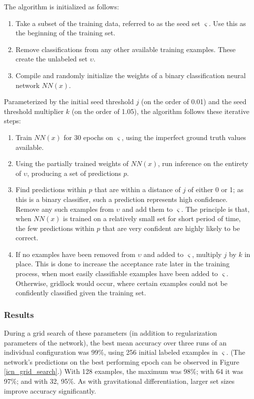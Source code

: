 \documentclass[10pt]{article}
\begin{document}
The algorithm is initialized as follows:

\begin{enumerate}
    \item Take a subset of the training data, referred to as the seed set $\varsigma$. Use this as the beginning of the training set.
    \item Remove classifications from any other available training examples. These create the unlabeled set $\upsilon$.
    \item Compile and randomly initialize the weights of a binary classification neural network $NN(x)$.
\end{enumerate}

Parameterized by the initial seed threshold $j$ (on the order of 0.01) and the seed threshold multiplier $k$ (on the order of 1.05), the algorithm follows these iterative steps:

\begin{enumerate}
    \item Train $NN(x)$ for 30 epochs on $\varsigma$, using the imperfect ground truth values available.
    \item Using the partially trained weights of $NN(x)$, run inference on the entirety of $\upsilon$, producing a set of predictions $p$.
    \item Find predictions within $p$ that are within a distance of $j$ of either 0 or 1; as this is a binary classifier, such a prediction represents high confidence. Remove any such examples from $\upsilon$ and add them to $\varsigma$. The principle is that, when $NN(x)$ is trained on a relatively small set for short period of time, the few predictions within $p$ that are very confident are highly likely to be correct.
    \item If no examples have been removed from $\upsilon$ and added to $\varsigma$, multiply $j$ by $k$ in place. This is done to increase the acceptance rate later in the training process, when most easily classifiable examples have been added to $\varsigma$. Otherwise, gridlock would occur, where certain examples could not be confidently classified given the training set.
\end{enumerate}

\subsubsection{Results}

During a grid search of these parameters (in addition to regularization parameters of the network), the best mean accuracy over three runs of an individual configuration was 99\%, using 256 initial labeled examples in $\varsigma$. (The network's predictions on the best performing epoch can be observed in Figure \ref{icn_grid_search}.) With 128 examples, the maximum was 98\%; with 64 it was 97\%; and with 32, 95\%. As with gravitational differentiation, larger set sizes improve accuracy significantly.
\end{document}
